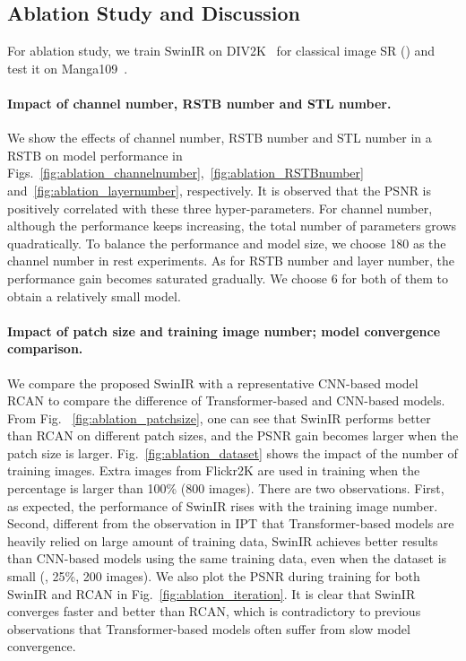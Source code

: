 \documentclass[10pt,twocolumn,letterpaper]{article}
\newlength \g
\begin{document}
\subsection{Ablation Study and Discussion}
For ablation study, we train SwinIR on DIV2K~\cite{DIV2K} for classical image SR () and test it on Manga109~\cite{Manga109}.

\vspace{-0.4cm}
\paragraph{Impact of channel number, RSTB number and STL number.}
We show the effects of channel number, RSTB number and STL number in a RSTB on model performance in Figs.~\ref{fig:ablation_channelnumber},~\ref{fig:ablation_RSTBnumber} and~\ref{fig:ablation_layernumber}, respectively. It is observed that the PSNR is positively correlated with these three hyper-parameters. For channel number, although the performance keeps increasing, the total number of parameters grows quadratically. To balance the performance and model size, we choose 180 as the channel number in rest experiments. As for RSTB number and layer number, the performance gain becomes saturated gradually. We choose 6 for both of them to obtain a relatively small model. 



\vspace{-0.4cm}
\paragraph{Impact of patch size and training image number; model convergence comparison.}
We compare the proposed SwinIR with a representative CNN-based model RCAN to compare the difference of Transformer-based and CNN-based models. From Fig.~
\ref{fig:ablation_patchsize}, one can see that SwinIR performs better than RCAN on different patch sizes, and the PSNR gain becomes larger when the patch size is larger. Fig.~\ref{fig:ablation_dataset} shows the impact of the number of training images. Extra images from Flickr2K are used in training when the percentage is larger than 100\% (800 images). There are two observations. First, as expected, the performance of SwinIR rises with the training image number. Second, different from the observation in IPT that Transformer-based models are heavily relied on large amount of training data, SwinIR achieves better results than CNN-based models using the same training data, even when the dataset is small (\ie, 25\%, 200 images).  We also plot the PSNR during training for both SwinIR and RCAN in Fig.~\ref{fig:ablation_iteration}. It is clear that SwinIR converges faster and better than RCAN, which is contradictory to previous observations that Transformer-based models often suffer from slow model convergence.
\end{document}
